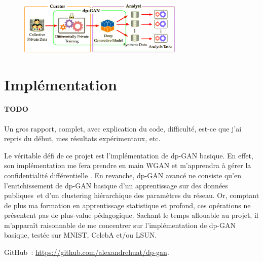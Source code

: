 \documentclass[a4paper,11pt]{article}
\theoremstyle{definition}
\newcommand{\TODO}[1]{{\color{orange}\sffamily\paragraph{\sffamily TODO} #1\\}}
\begin{document}
\begin{figure}
    \centering
    \includegraphics[width=0.7\textwidth]{dp-gan_role.png}
    \label{dp-gan_role}
\end{figure}

\section{Implémentation}

\TODO{Un gros rapport, complet, avec explication du code, difficulté, est-ce que j'ai repris du début, mes résultats expérimentaux, etc.}

Le véritable défi de ce projet est l'implémentation de dp-GAN basique. En effet, son implémentation me fera prendre en main WGAN et m'apprendra à gérer la confidentialité différentielle \citep{dlwdp, pinq}. En revanche, dp-GAN avancé ne consiste qu'en l'enrichissement de dp-GAN basique d'un apprentissage sur des données publiques et d'un clustering hiérarchique des paramètres du réseau. Or, comptant de plus ma formation en apprentissage statistique et profond, ces opérations ne présentent pas de plus-value pédagogique. Sachant le temps allouable au projet, il m'apparaît raisonnable de me concentrer sur l'implémentation de dp-GAN basique, testée sur MNIST, CelebA et/ou LSUN.

GitHub : \url{https://github.com/alexandrehuat/dp-gan}.

\printbibliography[title=Références,heading=bibintoc]
\end{document}
